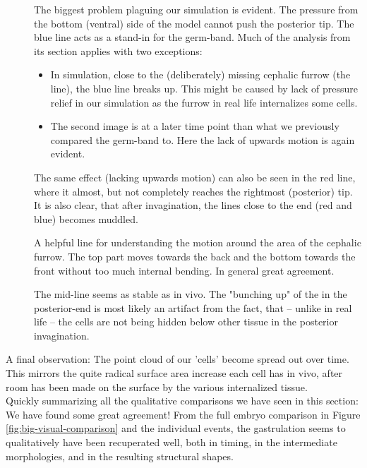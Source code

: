 \begin{description}
   \item[] The biggest problem plaguing our simulation is evident. The pressure from the bottom (ventral) side of the model cannot push the posterior tip. The blue line acts as a stand-in for the germ-band. Much of the analysis from its section applies with two exceptions:
   \begin{itemize}
       \item In simulation, close to the (deliberately) missing cephalic furrow (the  line), the blue line breaks up. This might be caused by lack of pressure relief in our simulation as the furrow in real life internalizes some cells.
       \item The second image is at a later time point than what we previously compared the germ-band to. Here the lack of upwards motion is again evident.
   \end{itemize}
   \item[] The same effect (lacking upwards motion) can also be seen in the red line, where it almost, but not completely reaches the rightmost (posterior) tip. It is also clear, that after invagination,  the lines close to the end (red and blue) becomes muddled.
   \item[] A helpful line for understanding the motion around the area of the cephalic furrow. The top part moves towards the back and the bottom towards the front without too much internal bending. In general great agreement. 
   \item[] The mid-line seems as stable as in vivo. The "bunching up" of the  in the posterior-end is most likely an artifact from the fact, that -- unlike in real life -- the cells are not being hidden below other tissue in the posterior invagination.
\end{description}


A final observation: The point cloud of our 'cells' become spread out over time. This mirrors the quite radical surface area increase each cell has in vivo, after room has been made on the surface by the various internalized tissue.  \\


Quickly summarizing all the qualitative comparisons we have seen in this section: We have found some great agreement! From the full embryo comparison in Figure \ref{fig:big-visual-comparison} and the individual events, the gastrulation seems to qualitatively have been recuperated well, both in timing, in the intermediate morphologies, and in the resulting structural shapes.


